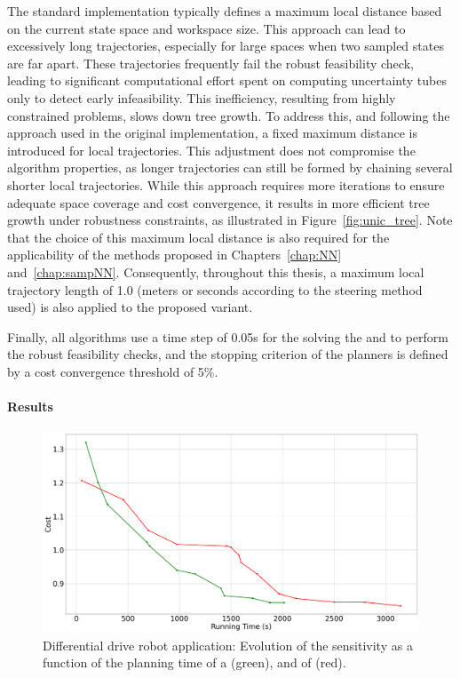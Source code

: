 The standard   implementation typically defines a maximum local distance based on the current state space and workspace size.
This approach can lead to excessively long trajectories, especially for large spaces when two sampled states are far apart.
These trajectories frequently fail the robust feasibility check, leading to significant computational effort spent on computing uncertainty tubes only to detect early infeasibility. 
This inefficiency, resulting from highly constrained problems, slows down tree growth.
To address this, and following the approach used in the original  implementation, a fixed maximum distance is introduced for local trajectories. 
This adjustment does not compromise the algorithm properties, as longer trajectories can still be formed by chaining several shorter local trajectories. 
While this approach requires more iterations to ensure adequate space coverage and cost convergence, it results in more efficient tree growth under robustness constraints, as illustrated in Figure~\ref{fig:unic_tree}.
Note that the choice of this maximum local distance is also required for the applicability of the methods proposed in Chapters~\ref{chap:NN} and~\ref{chap:sampNN}.
Consequently, throughout this thesis, a maximum local trajectory length of 1.0 (meters or seconds according to the steering method used) is also applied to the proposed  variant.

Finally, all algorithms use a time step of 0.05s for the solving the  and to perform the robust feasibility checks, and the stopping criterion of the planners is defined by a cost convergence threshold of 5\%.

\paragraph{Results}



\begin{figure} [t!]
    \centering
    \includegraphics[width=0.6\linewidth]{figures/samp/unicycle_cost_conv.png} 
    \caption{Differential drive robot application: Evolution of the sensitivity as a function of the planning time of a  (green), and of  (red).}%
    \label{fig:samp_unic_time}%
\end{figure}

